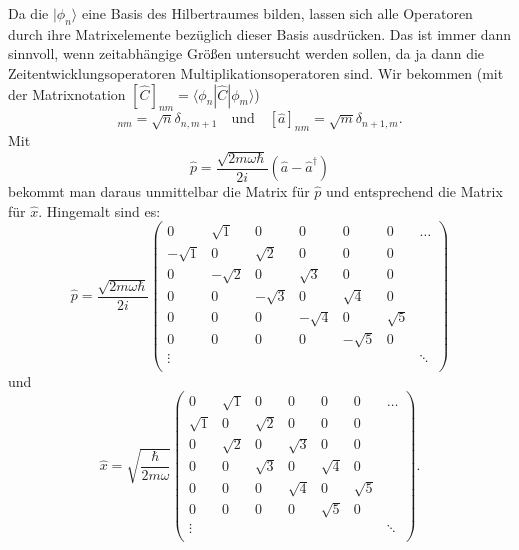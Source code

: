 Da die $|\phi_n\rangle$ eine Basis des Hilbertraumes bilden, lassen sich alle Operatoren durch ihre Matrixelemente bezüglich dieser Basis ausdrücken. Das ist immer dann sinnvoll, wenn zeitabhängige Größen untersucht werden sollen, da ja dann die Zeitentwicklungsoperatoren Multiplikationsoperatoren sind. Wir bekommen
(mit der Matrixnotation $[\widehat{C}]_{nm} = \langle\phi_n|\widehat{C}|\phi_m\rangle$)
\begin{equation}
	[\widehat{a}^\dag]_{nm} = \sqrt{n}\delta_{n,m+1} \quad \text{und} \quad [\widehat{a}]_{nm} = \sqrt{m}\delta_{n+1,m}.
\end{equation}
Mit 
\begin{equation}
	\widehat{p} = \frac{\sqrt{2m\omega\hbar}}{2i}(\widehat{a}-\widehat{a}^\dag) 
\end{equation}
bekommt man daraus unmittelbar die Matrix für $\widehat{p}$ und entsprechend die Matrix für $\widehat{x}$. Hingemalt sind es:
\begin{equation}
	\widehat{p} = \frac{\sqrt{2m\omega\hbar}}{2i}
	\begin{pmatrix}
		0 & \sqrt{1} & 0 & 0 & 0 & 0 & \hdots \\
		-\sqrt{1} & 0 & \sqrt{2} & 0 & 0 & 0 & \\
		0 & -\sqrt{2} & 0 & \sqrt{3} & 0 & 0 & \\
		0 & 0 & -\sqrt{3} & 0 & \sqrt{4} & 0 & \\
		0 & 0 & 0 & -\sqrt{4} & 0 & \sqrt{5} & \\
		0 & 0 & 0 & 0 & -\sqrt{5} & 0 & \\
		\vdots & & & & & & \ddots \\
	\end{pmatrix}
\end{equation}
und
\begin{equation}
	\widehat{x} = \sqrt{\frac{\hbar}{2m\omega}}
	\begin{pmatrix}
		0 & \sqrt{1} & 0 & 0 & 0 & 0 & \hdots \\
		\sqrt{1} & 0 & \sqrt{2} & 0 & 0 & 0 & \\
		0 & \sqrt{2} & 0 & \sqrt{3} & 0 & 0 & \\
		0 & 0 & \sqrt{3} & 0 & \sqrt{4} & 0 & \\
		0 & 0 & 0 & \sqrt{4} & 0 & \sqrt{5} & \\
		0 & 0 & 0 & 0 & \sqrt{5} & 0 & \\
		\vdots & & & & & & \ddots \\
	\end{pmatrix}.
\end{equation}

